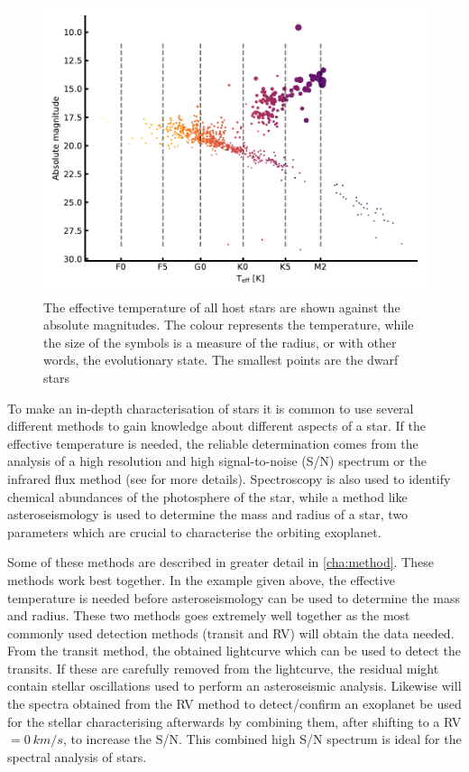 \begin{figure}[htpb!]
    \centering
    \includegraphics[width=1.0\linewidth]{figures/hostDistribution.pdf}
    \caption{The effective temperature of all host stars are shown against the absolute magnitudes.
             The colour represents the temperature, while the size of the symbols is a measure of
             the radius, or with other words, the evolutionary state. The smallest points are the
             dwarf stars}
    \label{fig:hostDistribution}
\end{figure}

To make an in-depth characterisation of stars it is common to use several different methods to gain
knowledge about different aspects of a star. If the effective temperature is needed, the reliable
determination comes from the analysis of a high resolution and high signal-to-noise (S/N) spectrum
or the infrared flux method (see  for more details). Spectroscopy is also used to
identify chemical abundances of the photosphere of the star, while a method like asteroseismology is
used to determine the mass and radius of a star, two parameters which are crucial to characterise
the orbiting exoplanet.

Some of these methods are described in greater detail in \cref{cha:method}. These methods work best
together. In the example given above, the effective temperature is needed before asteroseismology
can be used to determine the mass and radius. These two methods goes extremely well together as the
most commonly used detection methods (transit and RV) will obtain the data needed. From the transit
method, the obtained lightcurve which can be used to detect the transits. If these are carefully
removed from the lightcurve, the residual might contain stellar oscillations used to perform an
asteroseismic analysis. Likewise will the spectra obtained from the RV method to detect/confirm an
exoplanet be used for the stellar characterising afterwards by combining them, after shifting to a
RV$=\SI{0}{km/s}$, to increase the S/N. This combined high S/N spectrum is ideal for the spectral
analysis of stars.

